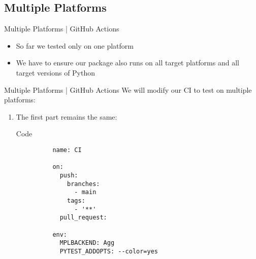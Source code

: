 \subsection{Multiple Platforms}
\begin{frame}[fragile]{Multiple Platforms | GitHub Actions}
 \begin{itemize}
   \setlength{\itemsep}{1em}
   \item So far we tested only on one platform
   \item We have to ensure our package also runs on all target platforms
      and all target versions of Python
  \end{itemize}
\end{frame}

\begin{frame}[fragile]{Multiple Platforms | GitHub Actions}
  We will modify our CI to test on multiple platforms:
  \begin{enumerate}
    \item The first part remains the same:
      \begin{block}{Code}
        \begin{verbatim}
          name: CI

          on:
            push:
              branches:
                - main
              tags:
                - '**'
            pull_request:

          env:
            MPLBACKEND: Agg
            PYTEST_ADDOPTS: --color=yes
        \end{verbatim}
      \end{block}
  \end{enumerate}
\end{frame}

